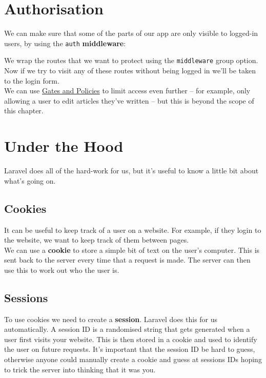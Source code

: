 \section{Authorisation}

We can make sure that some of the parts of our app are only visible to logged-in users, by using the \texttt{auth} \textbf{middleware}:


We wrap the routes that we want to protect using the \texttt{middleware} group option. Now if we try to visit any of these routes without being logged in we'll be taken to the login form.
\\

We can use \href{http://laravel.com/docs/master/authorization}{Gates and Policies} to limit access even further – for example, only allowing a user to edit articles they've written – but this is beyond the scope of this chapter.


\section{Under the Hood}

Laravel does all of the hard-work for us, but it's useful to know a little bit about what's going on.

\subsection{Cookies}

It can be useful to keep track of a user on a website. For example, if they login to the website, we want to keep track of them between pages.
\\

We can use a \textbf{cookie} to store a simple bit of text on the user's computer. This is sent back to the server every time that a request is made. The server can then use this to work out who the user is.

\subsection{Sessions}

To use cookies we need to create a \textbf{session}. Laravel does this for us automatically. A session ID is a randomised string that gets generated when a user first visits your website. This is then stored in a cookie and used to identify the user on future requests. It's important that the session ID be hard to guess, otherwise anyone could manually create a cookie and guess at sessions IDs hoping to trick the server into thinking that it was you.
\\

